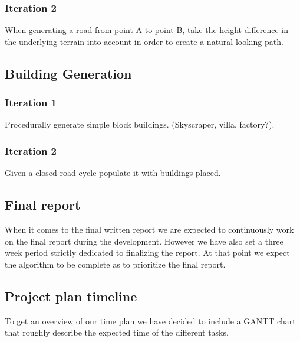 \subsubsection{Iteration 2}
When generating a road from point A to point B, take the height difference in the underlying terrain into account in order to create a natural looking path.

\subsection{Building Generation}
\subsubsection{Iteration 1}
Procedurally generate simple block buildings. (Skyscraper, villa, factory?).

\subsubsection{Iteration 2}
Given a closed road cycle populate it with buildings placed.

\subsection{Final report}
When it comes to the final written report we are expected to continuously work on the final report during the development.
However we have also set a three week period strictly dedicated to finalizing the report.
At that point we expect the algorithm to be complete as to prioritize the final report.

\subsection{Project plan timeline}
To get an overview of our time plan we have decided to include a GANTT chart that roughly describe the expected time of the different tasks.



